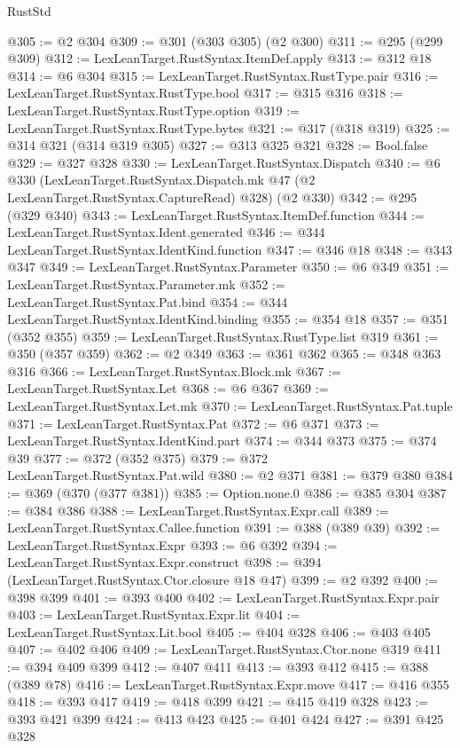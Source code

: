 \begin{lexlean}{RustStd}
\begin{coremodule}
@305 := @2 @304
@309 := @301 (@303 @305) (@2 @300)
@311 := @295 (@299 @309)
@312 := LexLeanTarget.RustSyntax.ItemDef.apply
@313 := @312 @18
@314 := @6 @304
@315 := LexLeanTarget.RustSyntax.RustType.pair
@316 := LexLeanTarget.RustSyntax.RustType.bool
@317 := @315 @316
@318 := LexLeanTarget.RustSyntax.RustType.option
@319 := LexLeanTarget.RustSyntax.RustType.bytes
@321 := @317 (@318 @319)
@325 := @314 @321 (@314 @319 @305)
@327 := @313 @325 @321
@328 := Bool.false
@329 := @327 @328
@330 := LexLeanTarget.RustSyntax.Dispatch
@340 := @6
    @330
    (LexLeanTarget.RustSyntax.Dispatch.mk @47 (@2 LexLeanTarget.RustSyntax.CaptureRead) @328)
    (@2 @330)
@342 := @295 (@329 @340)
@343 := LexLeanTarget.RustSyntax.ItemDef.function
@344 := LexLeanTarget.RustSyntax.Ident.generated
@346 := @344 LexLeanTarget.RustSyntax.IdentKind.function
@347 := @346 @18
@348 := @343 @347
@349 := LexLeanTarget.RustSyntax.Parameter
@350 := @6 @349
@351 := LexLeanTarget.RustSyntax.Parameter.mk
@352 := LexLeanTarget.RustSyntax.Pat.bind
@354 := @344 LexLeanTarget.RustSyntax.IdentKind.binding
@355 := @354 @18
@357 := @351 (@352 @355)
@359 := LexLeanTarget.RustSyntax.RustType.list @319
@361 := @350 (@357 @359)
@362 := @2 @349
@363 := @361 @362
@365 := @348 @363 @316
@366 := LexLeanTarget.RustSyntax.Block.mk
@367 := LexLeanTarget.RustSyntax.Let
@368 := @6 @367
@369 := LexLeanTarget.RustSyntax.Let.mk
@370 := LexLeanTarget.RustSyntax.Pat.tuple
@371 := LexLeanTarget.RustSyntax.Pat
@372 := @6 @371
@373 := LexLeanTarget.RustSyntax.IdentKind.part
@374 := @344 @373
@375 := @374 @39
@377 := @372 (@352 @375)
@379 := @372 LexLeanTarget.RustSyntax.Pat.wild
@380 := @2 @371
@381 := @379 @380
@384 := @369 (@370 (@377 @381))
@385 := Option.none.{0}
@386 := @385 @304
@387 := @384 @386
@388 := LexLeanTarget.RustSyntax.Expr.call
@389 := LexLeanTarget.RustSyntax.Callee.function
@391 := @388 (@389 @39)
@392 := LexLeanTarget.RustSyntax.Expr
@393 := @6 @392
@394 := LexLeanTarget.RustSyntax.Expr.construct
@398 := @394 (LexLeanTarget.RustSyntax.Ctor.closure @18 @47)
@399 := @2 @392
@400 := @398 @399
@401 := @393 @400
@402 := LexLeanTarget.RustSyntax.Expr.pair
@403 := LexLeanTarget.RustSyntax.Expr.lit
@404 := LexLeanTarget.RustSyntax.Lit.bool
@405 := @404 @328
@406 := @403 @405
@407 := @402 @406
@409 := LexLeanTarget.RustSyntax.Ctor.none @319
@411 := @394 @409 @399
@412 := @407 @411
@413 := @393 @412
@415 := @388 (@389 @78)
@416 := LexLeanTarget.RustSyntax.Expr.move
@417 := @416 @355
@418 := @393 @417
@419 := @418 @399
@421 := @415 @419 @328
@423 := @393 @421 @399
@424 := @413 @423
@425 := @401 @424
@427 := @391 @425 @328

\end{coremodule}
\end{lexlean}
